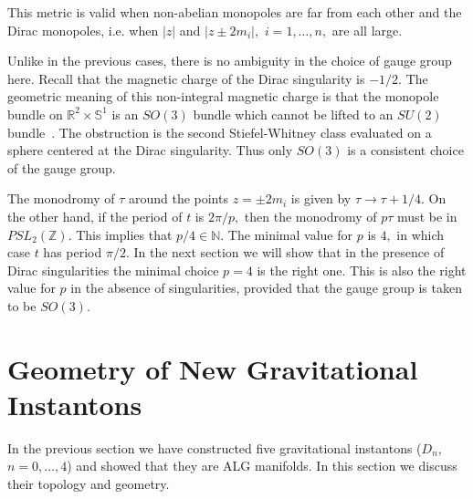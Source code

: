 \documentclass[a4paper,12pt, amsfonts, amssymb]{article}
\newcommand{\RR}{{\mathbb R}}
\newcommand{\ZZ}{{\mathbb Z}}
\newcommand{\NN}{{\mathbb N}}
\renewcommand{\SS}{{\mathbb S}}
\newcommand{\ra}{\rightarrow}
\begin{document}
This metric is valid when non-abelian monopoles are far from each other
and the Dirac monopoles, i.e. when $|z|$ and $|z\pm 2m_i|,$ $i=1,\ldots,n,$
are all large.

Unlike in the previous cases, there is no ambiguity in the choice of
gauge group here. Recall that the magnetic
charge of the Dirac singularity is $-1/2.$ The geometric meaning of
this non-integral magnetic charge is that the monopole bundle on
$\RR^2\times\SS^1$ is an $SO(3)$ bundle which cannot be lifted
to an $SU(2)$ bundle~\cite{ustwo}. The obstruction is the second
Stiefel-Whitney class evaluated on a sphere centered at the Dirac
singularity. Thus only $SO(3)$ is a consistent choice of the gauge group.

The monodromy of $\tau$ around
the points $z=\pm 2 m_i$ is given by $\tau\ra\tau + 1/4.$ On the other
hand, if the period of $t$ is $2\pi/p,$ then the monodromy of
$p\tau$ must be in $PSL_2(\ZZ).$ This implies that $p/4\in\NN.$
The minimal value for $p$ is $4,$ in which case $t$ has
period $\pi/2.$
In the next section we will show that in the presence of Dirac
singularities the minimal choice $p=4$ is the right one.
This is also the right value for $p$ in the absence of singularities,
provided that the gauge group is taken to be $SO(3).$



\section{Geometry of New Gravitational Instantons}

In the previous section we have constructed five gravitational instantons
($D_n,$ $n=0,\ldots,4$)
and showed that they are ALG manifolds. In this section we discuss their
topology and geometry.
\end{document}
